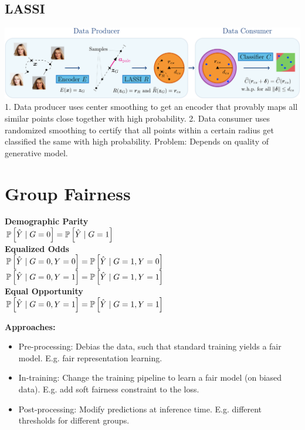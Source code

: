 \subsection*{LASSI}
\includegraphics[width=1\columnwidth]{img/lassi.png}
1. Data producer uses center smoothing to get an encoder that provably maps all similar points close together with high probability. 2. Data consumer uses randomized smoothing to certify that all points within a certain radius get classified the same with high probability. Problem: Depends on quality of generative model.

\section{Group Fairness}
\textbf{Demographic Parity}\\
$\P\left[\hat Y\mid G=0\right]=\P\left[\hat Y\mid G=1\right]$\\
\textbf{Equalized Odds}\\
$\P\left[\hat Y\mid G=0,Y=0\right]=\P\left[\hat Y\mid G=1,Y=0\right]$\\
$\P\left[\hat Y\mid G=0,Y=1\right]=\P\left[\hat Y\mid G=1,Y=1\right]$\\
\textbf{Equal Opportunity}\\
$\P\left[\hat Y\mid G=0,Y=1\right]=\P\left[\hat Y\mid G=1,Y=1\right]$

\textbf{Approaches:}
\begin{itemize}
    \item Pre-processing: Debias the data, such that standard training yields a fair model. E.g. fair representation learning.
    \item In-training: Change the training pipeline to learn a fair model (on biased data). E.g. add soft fairness constraint to the loss.
    \item Post-processing: Modify predictions at inference time. E.g. different thresholds for different groups.
\end{itemize}


